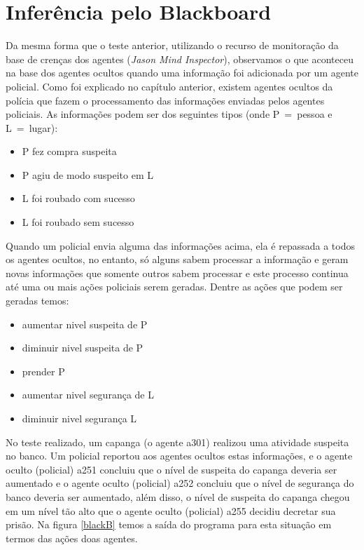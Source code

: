 \section{Inferência pelo Blackboard}
Da mesma forma que o teste anterior, utilizando o recurso de monitoração da base de crenças dos agentes (\emph{Jason Mind Inspector}), observamos o que aconteceu na base dos agentes ocultos quando uma informação foi adicionada por um agente policial.
Como foi explicado no capítulo anterior, existem agentes ocultos da polícia que fazem o processamento das informações enviadas pelos agentes policiais. As informações podem ser dos seguintes tipos (onde P~=~pessoa e L~=~lugar):
\begin{itemize}
\item P fez compra suspeita
\item P agiu de modo suspeito em L
\item L foi roubado com sucesso
\item L foi roubado sem sucesso
\end{itemize}
Quando um policial envia alguma das informações acima, ela é repassada a todos os agentes ocultos, no entanto, só alguns sabem processar a informação e geram novas informações que somente outros sabem processar e este processo continua até uma ou mais ações policiais serem geradas.
Dentre as ações que podem ser geradas temos:
\begin{itemize}
\item aumentar nivel suspeita de P
\item diminuir nivel suspeita de P
\item prender P
\item aumentar nivel segurança de L
\item diminuir nivel segurança L 
\end{itemize}
No teste realizado, um capanga (o agente a301) realizou uma atividade suspeita no banco. Um policial reportou aos agentes ocultos estas informações, e o agente oculto (policial) a251 concluiu que o nível de suspeita do capanga deveria ser aumentado e o agente oculto (policial) a252 concluiu que o nível de segurança do banco deveria ser aumentado, além disso, o nível de suspeita do capanga chegou em um nível tão alto que o agente oculto (policial) a255 decidiu decretar sua prisão.
Na figura \ref{blackB} temos a saída do programa para esta situação em termos das ações doas agentes.

